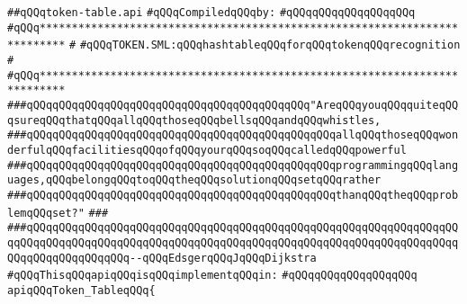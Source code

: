 \label{src/lib/c-kit/src/parser/grammar/token-table.api}
\verb|##qQQqtoken-table.api|\newline
\newline
\verb|#qQQqCompiledqQQqby:|\newline
\verb|#qQQqqQQqqQQqqQQqqQQq|\newline
\newline
\newline
\newline
\verb|#qQQq**************************************************************************|\newline
\verb|#|\newline
\verb|#qQQqTOKEN.SML:qQQqhashtableqQQqforqQQqtokenqQQqrecognition|\newline
\verb|#|\newline
\verb|#qQQq**************************************************************************|\newline
\newline
\newline
\verb|###qQQqqQQqqQQqqQQqqQQqqQQqqQQqqQQqqQQqqQQqqQQq"AreqQQqyouqQQqquiteqQQqsureqQQqthatqQQqallqQQqthoseqQQqbellsqQQqandqQQqwhistles,|\newline
\verb|###qQQqqQQqqQQqqQQqqQQqqQQqqQQqqQQqqQQqqQQqqQQqqQQqallqQQqthoseqQQqwonderfulqQQqfacilitiesqQQqofqQQqyourqQQqsoqQQqcalledqQQqpowerful|\newline
\verb|###qQQqqQQqqQQqqQQqqQQqqQQqqQQqqQQqqQQqqQQqqQQqqQQqprogrammingqQQqlanguages,qQQqbelongqQQqtoqQQqtheqQQqsolutionqQQqsetqQQqrather|\newline
\verb|###qQQqqQQqqQQqqQQqqQQqqQQqqQQqqQQqqQQqqQQqqQQqqQQqthanqQQqtheqQQqproblemqQQqset?"|\newline
\verb|###|\newline
\verb|###qQQqqQQqqQQqqQQqqQQqqQQqqQQqqQQqqQQqqQQqqQQqqQQqqQQqqQQqqQQqqQQqqQQqqQQqqQQqqQQqqQQqqQQqqQQqqQQqqQQqqQQqqQQqqQQqqQQqqQQqqQQqqQQqqQQqqQQqqQQqqQQqqQQqqQQqqQQq--qQQqEdsgerqQQqJqQQqDijkstra|\newline
\newline
\verb|#qQQqThisqQQqapiqQQqisqQQqimplementqQQqin:|\newline
\verb|#qQQqqQQqqQQqqQQqqQQq|\newline
\newline
\verb|apiqQQqToken_TableqQQq{|\newline
